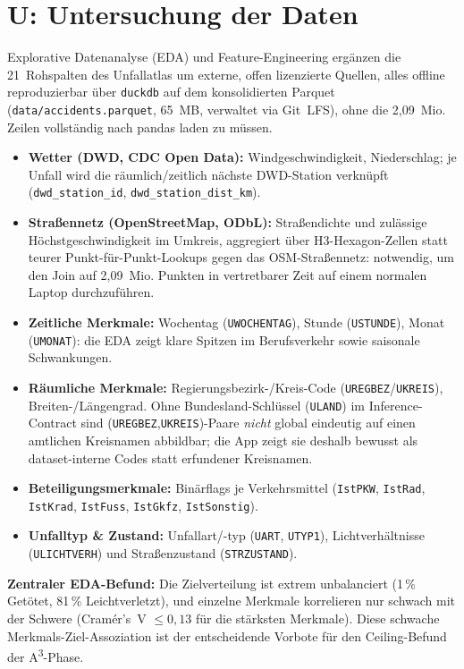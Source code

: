 \documentclass[11pt,a4paper]{article}
\newcommand{\code}[1]{\texttt{\small #1}}
\begin{document}
\section{U: Untersuchung der Daten}
Explorative Datenanalyse (EDA) und Feature-Engineering ergänzen die
21~Rohspalten des Unfallatlas um externe, offen lizenzierte Quellen,
alles offline reproduzierbar über \code{duckdb} auf dem konsolidierten
Parquet (\code{data/accidents.parquet}, 65~MB, verwaltet via Git~LFS),
ohne die 2{,}09~Mio. Zeilen vollständig nach pandas laden zu müssen.

\begin{itemize}
\item \textbf{Wetter (DWD, CDC Open Data):} Windgeschwindigkeit,
  Niederschlag; je Unfall wird die räumlich/zeitlich nächste
  DWD-Station verknüpft (\code{dwd\_station\_id}, \code{dwd\_station\_dist\_km}).
\item \textbf{Straßennetz (OpenStreetMap, ODbL):} Straßendichte und
  zulässige Höchstgeschwindigkeit im Umkreis, aggregiert über
  H3-Hexagon-Zellen statt teurer Punkt-für-Punkt-Lookups gegen das
  OSM-Straßennetz: notwendig, um den Join auf 2{,}09~Mio. Punkten in
  vertretbarer Zeit auf einem normalen Laptop durchzuführen.
\item \textbf{Zeitliche Merkmale:} Wochentag (\code{UWOCHENTAG}),
  Stunde (\code{USTUNDE}), Monat (\code{UMONAT}): die EDA zeigt klare
  Spitzen im Berufsverkehr sowie saisonale Schwankungen.
\item \textbf{Räumliche Merkmale:} Regierungsbezirk-/Kreis-Code
  (\code{UREGBEZ}/\code{UKREIS}), Breiten-/Längengrad. Ohne
  Bundesland-Schlüssel (\code{ULAND}) im Inference-Contract sind
  (\code{UREGBEZ},\code{UKREIS})-Paare \emph{nicht} global eindeutig auf
  einen amtlichen Kreisnamen abbildbar; die App zeigt sie deshalb
  bewusst als dataset-interne Codes statt erfundener Kreisnamen.
\item \textbf{Beteiligungsmerkmale:} Binärflags je Verkehrsmittel
  (\code{IstPKW}, \code{IstRad}, \code{IstKrad}, \code{IstFuss},
  \code{IstGkfz}, \code{IstSonstig}).
\item \textbf{Unfalltyp \& Zustand:} Unfallart/-typ (\code{UART},
  \code{UTYP1}), Lichtverhältnisse (\code{ULICHTVERH}) und
  Straßenzustand (\code{STRZUSTAND}).
\end{itemize}

\textbf{Zentraler EDA-Befund:} Die Zielverteilung ist extrem
unbalanciert (1\,\% Getötet, 81\,\% Leichtverletzt), und einzelne
Merkmale korrelieren nur schwach mit der Schwere (Cramér's~V
$\leq 0{,}13$ für die stärksten Merkmale). Diese schwache
Merkmals-Ziel-Assoziation ist der entscheidende Vorbote für den
Ceiling-Befund der A\textsuperscript{3}-Phase.
\end{document}
